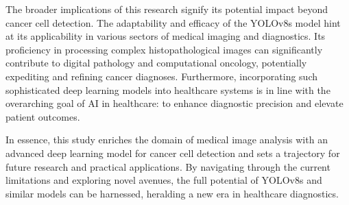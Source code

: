 \documentclass[anon]{midl} %
\begin{document}
The broader implications of this research signify its potential impact beyond cancer cell detection. The adaptability and efficacy of the YOLOv8s model hint at its applicability in various sectors of medical imaging and diagnostics. Its proficiency in processing complex histopathological images can significantly contribute to digital pathology and computational oncology, potentially expediting and refining cancer diagnoses. Furthermore, incorporating such sophisticated deep learning models into healthcare systems is in line with the overarching goal of AI in healthcare: to enhance diagnostic precision and elevate patient outcomes.

In essence, this study enriches the domain of medical image analysis with an advanced deep learning model for cancer cell detection and sets a trajectory for future research and practical applications. By navigating through the current limitations and exploring novel avenues, the full potential of YOLOv8s and similar models can be harnessed, heralding a new era in healthcare diagnostics.









\end{document}
